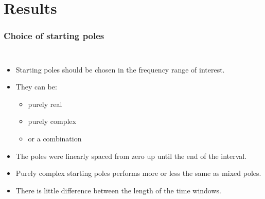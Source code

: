 \section{Results}
\begin{frame}
	\frametitle{Choice of starting poles}
		\begin{columns}[c]
			\begin{itemize}
				\item Starting poles should be chosen in the frequency range of interest.
				\item They can be:
				\begin{itemize}
					\item purely real
					\item purely complex
					\item or a combination
				\end{itemize}
				\item The poles were linearly spaced from zero up until the end of the interval.
				\item Purely complex starting poles performs more or less the same as mixed poles.
				\item There is little difference between the length of the time windows.
			\end{itemize}
\end{columns}
\end{frame}
